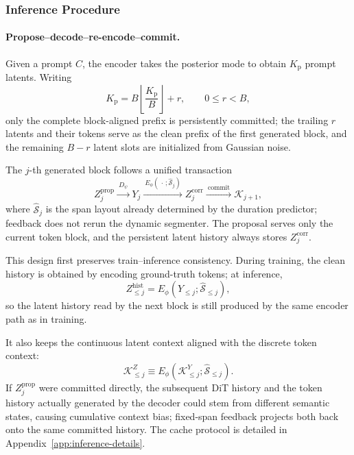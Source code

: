\subsubsection{Inference Procedure}
\label{subsec:workflow-infer}

\paragraph{Propose--decode--re-encode--commit.}
Given a prompt $C$, the encoder takes the posterior mode to obtain $K_{\mathrm p}$ prompt latents. Writing
\begin{equation}
    K_{\mathrm p}
    =B\left\lfloor\frac{K_{\mathrm p}}{B}\right\rfloor+r,
    \qquad 0\le r<B,
    \label{eq:workflow-prompt}
\end{equation}
only the complete block-aligned prefix is persistently committed; the trailing $r$ latents and their tokens serve as the clean prefix of the first generated block, and the remaining $B-r$ latent slots are initialized from Gaussian noise.

The $j$-th generated block follows a unified transaction
\begin{equation}
    Z_j^{\mathrm{prop}}
    \xrightarrow{\ D_\psi\ }
    Y_j
    \xrightarrow{\ E_\phi(\,\cdot\,;\widehat{\mathcal S}_j)\ }
    Z_j^{\mathrm{corr}}
    \xrightarrow{\ \mathrm{commit}\ }
    \mathcal K_{j+1},
    \label{eq:workflow-feedback}
\end{equation}
where $\widehat{\mathcal S}_j$ is the span layout already determined by the duration predictor; feedback does not rerun the dynamic segmenter. The proposal serves only the current token block, and the persistent latent history always stores $Z_j^{\mathrm{corr}}$.

This design first preserves train--inference consistency. During training, the clean history is obtained by encoding ground-truth tokens; at inference,
\begin{equation}
    Z_{\le j}^{\mathrm{hist}}
    =E_\phi\!\left(Y_{\le j};\widehat{\mathcal S}_{\le j}\right),
    \label{eq:workflow-train-infer-consistency}
\end{equation}
so the latent history read by the next block is still produced by the same encoder path as in training.

It also keeps the continuous latent context aligned with the discrete token context:
\begin{equation}
    \mathcal K^{Z}_{\le j}
    \equiv
    E_\phi\!\left(\mathcal K^{Y}_{\le j};\widehat{\mathcal S}_{\le j}\right).
    \label{eq:workflow-context-alignment}
\end{equation}
If $Z_j^{\mathrm{prop}}$ were committed directly, the subsequent DiT history and the token history actually generated by the decoder could stem from different semantic states, causing cumulative context bias; fixed-span feedback projects both back onto the same committed history. The cache protocol is detailed in Appendix~\ref{app:inference-details}.


